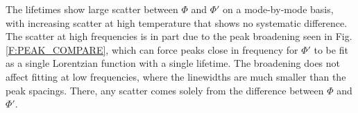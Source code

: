 \documentclass[12pt,twocolumn,iop]{/usr/share/texmf-texlive/tex/latex/iop/iopart}[/usr/share/texmf-texlive/tex/latex/iop/]
\begin{document}
The lifetimes show large scatter between $\Phi$ and $\Phi'$ on a mode-by-mode basis, with increasing scatter at high temperature that shows no systematic difference. The scatter at high frequencies is in part due to the peak broadening seen in Fig$.$ \ref{F:PEAK_COMPARE}, which can force peaks close in frequency for $\Phi'$ to be fit as a single Lorentzian function with a single lifetime. The broadening does not affect fitting at low frequencies, where the linewidths are much smaller than the peak spacings. There, any scatter comes solely from the difference between $\Phi$ and $\Phi'$.

\begin{figure}
\begin{center}





\end{center}
\end{figure}
\end{document}
